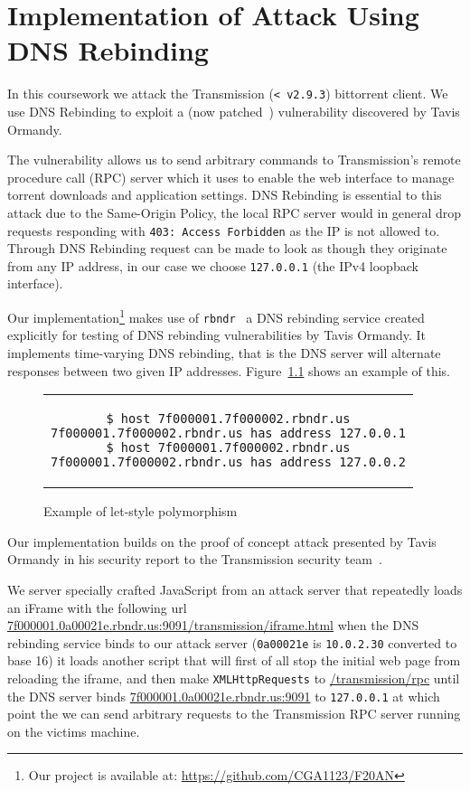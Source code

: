 \chapter{Implementation of Attack Using DNS Rebinding}
\label{implementation}

In this coursework we attack the Transmission (\texttt{< v2.9.3}) bittorrent
client. We use DNS Rebinding to exploit a (now patched~\cite{transmission_pr})
vulnerability discovered by Tavis Ormandy.

The vulnerability allows us to send arbitrary commands to Transmission's remote
procedure call (RPC) server which it uses to enable the web interface to manage
torrent downloads and application settings. DNS Rebinding is essential to this
attack due to the Same-Origin Policy, the local RPC server would in general
drop requests responding with \texttt{403: Access Forbidden} as the IP is not
allowed to. Through DNS Rebinding request can be made to look as though they
originate from any IP address, in our case we choose \texttt{127.0.0.1} (the
IPv4 loopback interface).

Our implementation\footnote{Our project is available at:
\url{https://github.com/CGA1123/F20AN}} makes use of
\texttt{rbndr}~\cite{rbndr} a DNS rebinding service created explicitly for
testing of DNS rebinding vulnerabilities by Tavis Ormandy. It implements
time-varying DNS rebinding, that is the DNS server will alternate responses
between two given IP addresses. Figure~\ref{rbndr_host} shows an example of
this.

\begin{figure}[H]
\begin{center}
\begin{tabular}{c}
\begin{lstlisting}
$ host 7f000001.7f000002.rbndr.us
7f000001.7f000002.rbndr.us has address 127.0.0.1
$ host 7f000001.7f000002.rbndr.us
7f000001.7f000002.rbndr.us has address 127.0.0.2
\end{lstlisting}
\end{tabular}
\end{center}
\caption{Example of let-style polymorphism}
\label{rbndr_host}
\end{figure}

Our implementation builds on the proof of concept attack presented by Tavis
Ormandy in his security report to the Transmission security
team~\cite{tavis_report}.

We server specially crafted JavaScript from an attack server that repeatedly
loads an iFrame with the following url
\url{7f000001.0a00021e.rbndr.us:9091/transmission/iframe.html} when the DNS
rebinding service binds to our attack server (\texttt{0a00021e} is
\texttt{10.0.2.30} converted to base 16) it loads another script that will
first of all stop the initial web page from reloading the iframe, and then make
\texttt{XMLHttpRequests} to \url{/transmission/rpc} until the DNS server binds
\url{7f000001.0a00021e.rbndr.us:9091} to \texttt{127.0.0.1} at which point the
we can send arbitrary requests to the Transmission RPC server running on the
victims machine.

